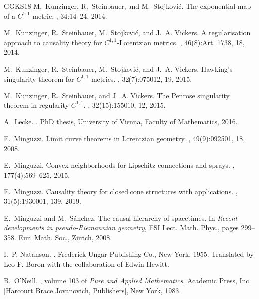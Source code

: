 \documentclass[reqno]{amsart}
\numberwithin{equation}{section}
\theoremstyle{plain}
\theoremstyle{definition}
\theoremstyle{remark}
\begin{document}
\begin{thebibliography}{GGKS18}
M.~Kunzinger, R.~Steinbauer, and M.~Stojkovi{\'c}.
\newblock The exponential map of a {$C^{1,1}$}-metric.
, 34:14--24, 2014.

M.~Kunzinger, R.~Steinbauer, M.~Stojkovi{\'c}, and J.~A. Vickers.
\newblock A regularisation approach to causality theory for
  {$C^{1,1}$}-{L}orentzian metrics.
, 46(8):Art. 1738, 18, 2014.

M.~Kunzinger, R.~Steinbauer, M.~Stojkovi{\'c}, and J.~A. Vickers.
\newblock Hawking's singularity theorem for {$C^{1,1}$}-metrics.
, 32(7):075012, 19, 2015.

M.~Kunzinger, R.~Steinbauer, and J.~A. Vickers.
\newblock The {P}enrose singularity theorem in regularity {$C^{1,1}$}.
, 32(15):155010, 12, 2015.

A.~Lecke.
.
\newblock PhD thesis, University of Vienna, Faculty of Mathematics, 2016.

E.~Minguzzi.
\newblock Limit curve theorems in {L}orentzian geometry.
, 49(9):092501, 18, 2008.

E.~Minguzzi.
\newblock Convex neighborhoods for {L}ipschitz connections and sprays.
, 177(4):569--625, 2015.

E.~Minguzzi.
\newblock Causality theory for closed cone structures with applications.
, 31(5):1930001, 139, 2019.

E.~Minguzzi and M.~S{\'a}nchez.
\newblock The causal hierarchy of spacetimes.
\newblock In {\em Recent developments in pseudo-{R}iemannian geometry}, ESI
  Lect. Math. Phys., pages 299--358. Eur. Math. Soc., Z\"urich, 2008.

I.~P. Natanson.
.
\newblock Frederick Ungar Publishing Co., New York, 1955.
\newblock Translated by Leo F. Boron with the collaboration of Edwin Hewitt.

B.~O'Neill.
,
  volume 103 of {\em Pure and Applied Mathematics}.
\newblock Academic Press, Inc. [Harcourt Brace Jovanovich, Publishers], New
  York, 1983.


\end{thebibliography}
\end{document}
